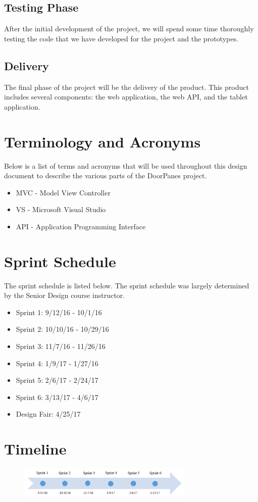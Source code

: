 \subsection{Testing Phase}
After the initial development of the project, we will spend some time thoroughly testing the code that we have developed for the project and the prototypes.

\subsection{Delivery}
The final phase of the project will be the delivery of the product. This product includes several components: the web application, the web API, and the tablet application. 

\section{Terminology and Acronyms}
Below is a list of terms and acronyms that will be used throughout this design document to describe the various parts of the DoorPanes project.

\begin{itemize}
\item MVC - Model View Controller
\item VS - Microsoft Visual Studio
\item API - Application Programming Interface
\end{itemize}

\section{Sprint Schedule}
The sprint schedule is listed below. The sprint schedule was largely determined by the Senior Design course instructor.

\begin{itemize}
\item Sprint 1: 9/12/16 - 10/1/16
\item Sprint 2: 10/10/16 - 10/29/16
\item Sprint 3: 11/7/16 - 11/26/16
\item Sprint 4: 1/9/17 - 1/27/16
\item Sprint 5: 2/6/17 - 2/24/17
\item Sprint 6: 3/13/17 - 4/6/17
\item Design Fair: 4/25/17
\end{itemize}

\section{Timeline}
\begin{figure}[tbh]
\begin{center}
\includegraphics[width=0.75\textwidth]{./timeline.PNG}
\end{center}
\label{sprinttimeline}
\end{figure}

